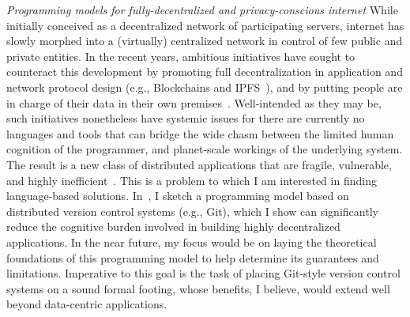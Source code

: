 {\itshape\color{MidnightBlue}Programming models for
fully-decentralized and privacy-conscious internet} While initially
conceived as a decentralized network of participating servers,
internet has slowly morphed into a (virtually) centralized network in
control of few public and private entities. In the recent years,
ambitious initiatives have sought to counteract this development by
promoting full decentralization in application and network protocol
design (e.g., Blockchains and IPFS~\cite{ipfs}), and by putting people
are in charge of their data in their own premises~\cite{trvedata}.
Well-intended as they may be, such initiatives nonetheless have
systemic issues for there are currently no languages and tools that
can bridge the wide chasm between the limited human cognition of the
programmer, and planet-scale workings of the underlying system. The
result is a new class of distributed applications that are fragile,
vulnerable, and highly inefficient~\cite{daohack,madmax,bspwiki}.
This is a problem to which I am interested in finding language-based
solutions.  In~\cite{snapl19}, I sketch a programming model based on
distributed version control systems (e.g., Git), which I show can
significantly reduce the cognitive burden involved in building highly
decentralized applications. In the near future, my focus would be on
laying the theoretical foundations of this programming model to help
determine its guarantees and limitations. Imperative to this goal is
the task of placing Git-style version control systems on a sound
formal footing, whose benefits, I believe, would extend well beyond
data-centric applications.

